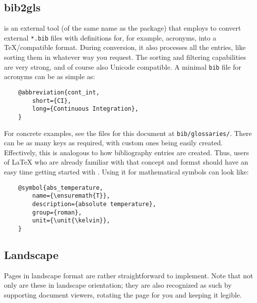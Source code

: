 \subsection{bib2gls}
\label{ch:bib2gls}

 is an external tool (of the same name as the package) that
 employs to convert external \texttt{*.bib} files with
definitions for, for example, acronyms, into a \TeX{}\-/compatible format.
During conversion, it also processes all the entries, like sorting them in whatever
way you request.
The sorting and filtering capabilities are very strong, and of course also Unicode
compatible.
A minimal \texttt{bib} file for acronyms can be as simple as:
\begin{verbatim}
    @abbreviation{cont_int,
        short={CI},
        long={Continuous Integration},
    }
\end{verbatim}
For concrete examples, see the files for this document at \texttt{bib/glossaries/}.
There can be as many keys as required, with custom ones being easily created.
Effectively, this is analogous to how bibliography entries are created.
Thus, users of \LaTeX{} who are already familiar with that concept and format
should have an easy time getting started with .
Using it for mathematical symbols can look like:
\begin{verbatim}
    @symbol{abs_temperature,
        name={\ensuremath{T}},
        description={absolute temperature},
        group={roman},
        unit={\unit{\kelvin}},
    }
\end{verbatim}

\begin{landscape}
    \section{Landscape}
    
    Pages in landscape format are rather straightforward to implement.
    Note that not only are these in landscape orientation; they are also recognized
    as such by supporting document viewers, rotating the page for you and keeping
    it legible.
\end{landscape}
